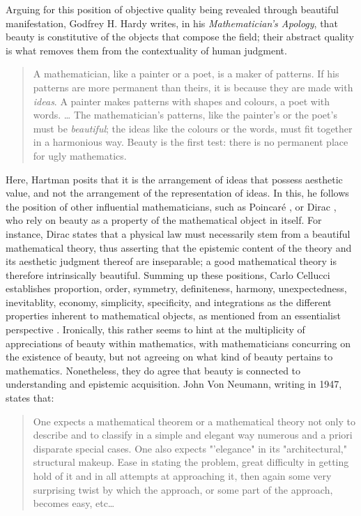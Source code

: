 Arguing for this position of objective quality being revealed through beautiful manifestation, Godfrey H. Hardy writes, in his \emph{Mathematician's Apology}, that beauty is constitutive of the objects that compose the field; their abstract quality is what removes them from the contextuality of human judgment.

\begin{quote}
    A mathematician, like a painter or a poet, is a maker of patterns. If his patterns are more permanent than theirs, it is because they are made with \emph{ideas}. A painter makes patterns with shapes and colours, a poet with words.
    \dots
    The mathematician's patterns, like the painter's or the poet's must be \emph{beautiful}; the ideas like the colours or the words, must fit together in a harmonious way. Beauty is the first test: there is no permanent place for ugly mathematics. \citep{hardy_mathematician_2012}
\end{quote}

Here, Hartman posits that it is the arrangement of ideas that possess aesthetic value, and not the arrangement of the representation of ideas. In this, he follows the position of other influential mathematicians, such as Poincaré \citep{poincare_science_1908}, or Dirac \citep{kragh_paul_2002}, who rely on beauty as a property of the mathematical object in itself. For instance, Dirac states that a physical law must necessarily stem from a beautiful mathematical theory, thus asserting that the epistemic content of the theory and its aesthetic judgment thereof are inseparable; a good mathematical theory is therefore intrinsically beautiful. Summing up these positions, Carlo Cellucci establishes proportion, order, symmetry, definiteness, harmony, unexpectedness, inevitablity, economy, simplicity, specificity,  and integrations as the different properties inherent to mathematical objects, as mentioned from an essentialist perspective \citep{cellucci_mathematical_2015}. Ironically, this rather seems to hint at the multiplicity of appreciations of beauty within mathematics, with mathematicians concurring on the existence of beauty, but not agreeing on what kind of beauty pertains to mathematics. Nonetheless, they do agree that beauty is connected to understanding and epistemic acquisition. John Von Neumann, writing in 1947, states that:

\begin{quote}
    One expects a mathematical theorem or a mathematical theory not only to describe and to classify in a simple and elegant way numerous and a priori disparate special cases. One also expects "'elegance" in its "architectural," structural makeup. Ease in stating the problem, great difficulty in getting hold of it and in all attempts at approaching it, then again some very surprising twist by which the approach, or some part of the approach, becomes easy, etc\dots \citep{vonneumann_mathematician_1947}
\end{quote}

